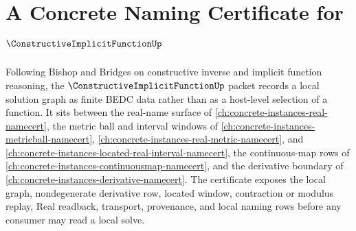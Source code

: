 \chapter{A Concrete Naming Certificate for $\ConstructiveImplicitFunctionUp$}
\label{ch:concrete-instances-constructive-implicit-function-namecert}

Following Bishop and Bridges on constructive inverse and implicit function reasoning, the $\ConstructiveImplicitFunctionUp$ packet records a local solution graph as finite BEDC data rather than as a host-level selection of a function. It sits between the real-name surface of \autoref{ch:concrete-instances-real-namecert}, the metric ball and interval windows of \autoref{ch:concrete-instances-metricball-namecert}, \autoref{ch:concrete-instances-real-metric-namecert}, and \autoref{ch:concrete-instances-located-real-interval-namecert}, the continuous-map rows of \autoref{ch:concrete-instances-continuousmap-namecert}, and the derivative boundary of \autoref{ch:concrete-instances-derivative-namecert}. The certificate exposes the local graph, nondegenerate derivative row, located window, contraction or modulus replay, Real readback, transport, provenance, and local naming rows before any consumer may read a local solve.

